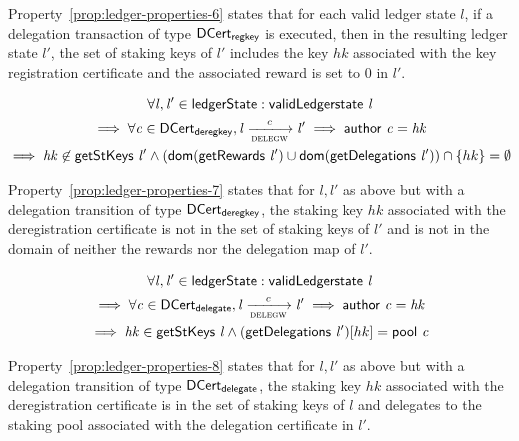 Property~\ref{prop:ledger-properties-6} states that for each valid ledger state
$l$, if a delegation transaction of type $\mathsf{DCert_{regkey}}$ is executed, then in the
resulting ledger state $l'$, the set of staking keys of $l'$ includes the key
$hk$ associated with the key registration certificate and the associated reward
is set to 0 in $l'$.

\begin{property}
  \begin{multline*}
    \forall \var{l}, \var{l'} \in \ledgerState: \applyFun{validLedgerstate}{l}\\
    \implies \forall \var{c} \in \DCertDeRegKey, \var{l} \trans{delegw}{c} \var{l'}
    \implies \applyFun{author}{c} = \var{hk}\\ \implies
    \var{hk} \not\in \applyFun{getStKeys}{l'} \wedge
    (\fun{dom}(\applyFun{getRewards}{l'}) \cup
    \fun{dom}(\applyFun{getDelegations}{l'})) \cap \{hk\} = \emptyset
  \end{multline*}
  \label{prop:ledger-properties-7}
\end{property}

Property~\ref{prop:ledger-properties-7} states that for $l, l'$ as above but
with a delegation transition of type $\mathsf{DCert_{deregkey}}$, the staking key $hk$
associated with the deregistration certificate is not in the set of staking keys
of $l'$ and is not in the domain of neither the rewards nor the delegation map
of $l'$.

\begin{property}
  \begin{multline*}
    \forall \var{l}, \var{l'} \in \ledgerState: \applyFun{validLedgerstate}{l}\\
    \implies \forall \var{c} \in \DCertDeleg, \var{l} \trans{delegw}{c} \var{l'}
    \implies \applyFun{author}{c} = \var{hk}\\ \implies
    \var{hk} \in \applyFun{getStKeys}{l} \wedge
    (\applyFun{getDelegations}{l'})[hk] = \applyFun{pool}{c}
  \end{multline*}
  \label{prop:ledger-properties-8}
\end{property}

Property~\ref{prop:ledger-properties-8} states that for $l, l'$ as above but
with a delegation transition of type $\mathsf{DCert_{delegate}}$, the staking key $hk$
associated with the deregistration certificate is in the set of staking keys of
$l$ and delegates to the staking pool associated with the delegation
certificate in $l'$.

